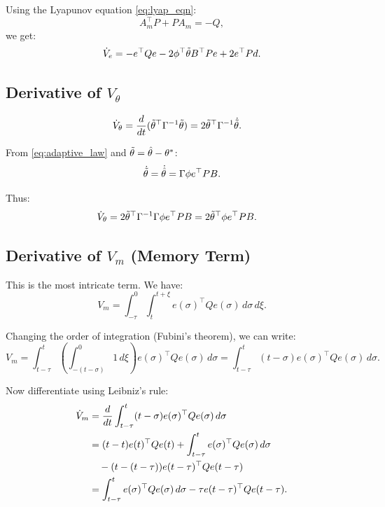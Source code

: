 Using the Lyapunov equation \eqref{eq:lyap_eqn}:
\begin{equation}
    A_m^\top P + P A_m = -Q,
\end{equation}
we get:
\begin{equation}
    \dot{V}_e = -e^\top Q e - 2 \phi^\top \tilde{\theta} B^\top P e + 2 e^\top P d.
\end{equation}

\subsection{Derivative of $V_\theta$}

\begin{align}
    \dot{V}_\theta &= \frac{d }{d t}(\tilde{\theta}^\top \Gamma^{-1} \tilde{\theta}) = 2 \tilde{\theta}^\top \Gamma^{-1} \dot{\tilde{\theta}}.
\end{align}

From \eqref{eq:adaptive_law} and $\tilde{\theta} = \hat{\theta} - \theta^*$:
\begin{equation}
    \dot{\tilde{\theta}} = \dot{\hat{\theta}} = \Gamma \phi e^\top P B.
\end{equation}

Thus:
\begin{align}
    \dot{V}_\theta &= 2 \tilde{\theta}^\top \Gamma^{-1} \Gamma \phi e^\top P B = 2 \tilde{\theta}^\top \phi e^\top P B.
\end{align}

\subsection{Derivative of $V_m$ (Memory Term)}

This is the most intricate term. We have:
\begin{equation}
    V_m = \int_{-\tau}^0 \int_t^{t+\xi} e(\sigma)^\top Q e(\sigma) \, d\sigma \, d\xi.
\end{equation}

Changing the order of integration (Fubini's theorem), we can write:
\begin{equation}
    V_m = \int_{t-\tau}^t \left( \int_{-(t-\sigma)}^0 1 \, d\xi \right) e(\sigma)^\top Q e(\sigma) \, d\sigma = \int_{t-\tau}^t (t - \sigma) e(\sigma)^\top Q e(\sigma) \, d\sigma.
\end{equation}

Now differentiate using Leibniz's rule:
\begin{align}
    \dot{V}_m &= \frac{d }{d t} \int_{t-\tau}^t (t - \sigma) e(\sigma)^\top Q e(\sigma) \, d\sigma \\
    &= (t - t) e(t)^\top Q e(t) + \int_{t-\tau}^t e(\sigma)^\top Q e(\sigma) \, d\sigma \nonumber \\
    &\quad - (t - (t-\tau)) e(t-\tau)^\top Q e(t-\tau) \\
    &= \int_{t-\tau}^t e(\sigma)^\top Q e(\sigma) \, d\sigma - \tau e(t-\tau)^\top Q e(t-\tau).
\end{align}


